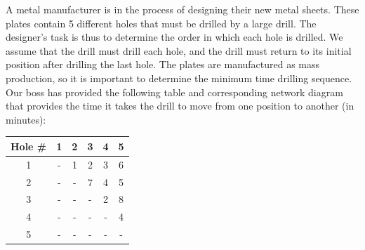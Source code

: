 \documentclass[12pt]{exam}
\newcommand{\answerbox}[3]{%
  \fbox{%
    \begin{minipage}[#1]{#2}
      \hfill\vspace{#3}
    \end{minipage}
  }
}
\newcommand{\answerboxone}[2]{%
  \answerbox{#1}{6.0in}{#2} 
}
\begin{document}
\begin{questions}





\newpage

\question A metal manufacturer is in the process of designing their new metal sheets. These plates contain 5 different holes that must be drilled by a large drill. The designer's task is thus to determine the order in which each hole is drilled. We assume that the drill must drill each hole, and the drill must return to its initial position after drilling the last hole. The plates are manufactured as mass production, so it is important to determine the minimum time drilling sequence. Our boss has provided the following table and corresponding network diagram that provides the time it takes the drill to move from one position to another (in minutes):

\begin{multicols}{2}
\begin{center}
\begin{tabular}{|c|c|c|c|c|c|}
\hline
Hole \# &  1	&	2	&	3	&	4	& 5\\ \hline
1 & - & 1&2 &3 &6 \\ \hline
2 &- & -& 7& 4& 5\\ \hline
3 &- & -&- & 2 & 8 \\ \hline
4 &- & -& -& -&4 \\ \hline
5 &- &- &- &- &- \\
\hline		
\end{tabular}
\end{center}


\end{multicols}
\end{questions}
\end{document}
